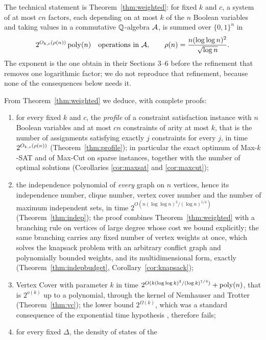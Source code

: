 The technical statement is Theorem~\ref{thm:weighted}: for fixed $k$ and $c$, a
system of at most $cn$ factors, each depending on at most $k$ of the $n$ Boolean
variables and taking values in a commutative $\mathbb{Q}$-algebra $\mathcal{A}$, is summed over
$\{0,1\}^n$ in
\begin{equation}\label{eq:rho}
  2^{O_{k,c}(\rho(n))}\operatorname{poly}(n) \quad\text{operations in $\mathcal{A}$},\qquad
  \rho(n)=\frac{n(\log\log n)^2}{\sqrt{\log n}} .
\end{equation}
The exponent is the one \oai{} obtain in their Sections 3--6 before the
refinement that removes one logarithmic factor; we do not reproduce that
refinement, because none of the consequences below needs it.

From Theorem~\ref{thm:weighted} we deduce, with complete proofs:
\begin{enumerate}[label=(\roman*),leftmargin=2.2em]
\item\label{it:profile} for every fixed $k$ and $c$, the \emph{profile} of a
constraint satisfaction instance with $n$ Boolean variables and at most $cn$
constraints of arity at most $k$, that is the number of assignments satisfying
exactly $j$ constraints for every $j$, in time $2^{O_{k,c}(\rho(n))}$
(Theorem~\ref{thm:profile}); in particular the exact optimum of Max-$k$-SAT and
of Max-Cut on sparse instances, together with the number of optimal solutions
(Corollaries \ref{cor:maxsat} and \ref{cor:maxcut});
\item\label{it:indep} the independence polynomial of \emph{every} graph on $n$
vertices, hence its independence number, clique number, vertex cover number and the
number of maximum independent sets, in time
$2^{O(n(\log\log n)^2/(\log n)^{1/4})}$ (Theorem~\ref{thm:indep}); the proof
combines Theorem~\ref{thm:weighted} with a branching rule on vertices of large
degree whose cost we bound explicitly; the same branching carries any fixed
number of vertex weights at once, which solves the knapsack problem with an
arbitrary conflict graph and polynomially bounded weights, and its
multidimensional form, exactly (Theorem~\ref{thm:indepbudget},
Corollary~\ref{cor:knapsack});
\item\label{it:vc} Vertex Cover with parameter $k$ in time
$2^{O(k(\log\log k)^2/(\log k)^{1/4})}+\operatorname{poly}(n)$, that is $2^{o(k)}$ up to a
polynomial, through the kernel of Nemhauser and Trotter (Theorem~\ref{thm:vc});
the lower bound $2^{\Omega(k)}$, which was a standard consequence of the
exponential time hypothesis \cite[Theorem 14.6]{CFKLMPPS15}, therefore fails;
\item\label{it:ising} for every fixed $\Delta$, the density of states of the

\end{enumerate}
